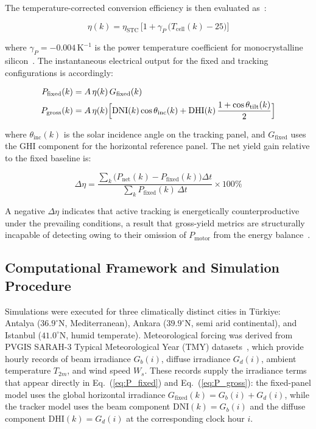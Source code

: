 \documentclass[preprint,3p,12pt]{elsarticle}
\newcommand{\degr}{^{\circ}}
\newcommand{\thetatilt}{\theta_{\mathrm{tilt}}}
\newcommand{\thetainc}{\theta_{\mathrm{inc}}}
\newcommand{\dt}{\Delta t}
\begin{document}
The temperature-corrected conversion efficiency is then evaluated as~\cite{Dubey2013}:

\begin{equation}
    \eta(k) = \eta_{\mathrm{STC}}\,\bigl[1 + \gamma_P\,
    \bigl(T_{\mathrm{cell}}(k) - 25\bigr)\bigr]
    \label{eq:eta_temp}
\end{equation}

where $\gamma_P = -0.004\,\mathrm{K}^{-1}$ is the power temperature coefficient for monocrystalline silicon~\cite{Dubey2013}. The instantaneous electrical output for the fixed and tracking configurations is accordingly:

\begin{align}
    P_{\mathrm{fixed}}(k) &= A\,\eta(k)\,G_{\mathrm{fixed}}(k)
    \label{eq:P_fixed}\\
    P_{\mathrm{gross}}(k) &= A\,\eta(k) \Bigl[
    \mathrm{DNI}(k)\cos\thetainc(k)
    + \mathrm{DHI}(k)\,\frac{1+\cos\thetatilt(k)}{2}
    \Bigr]
    \label{eq:P_gross}
\end{align}

where $\thetainc(k)$ is the solar incidence angle on the tracking panel, and $G_{\mathrm{fixed}}$ uses the GHI component for the horizontal reference panel. The net yield gain relative to the fixed baseline is:

\begin{equation}
    \Delta\eta = \frac{\sum_{k} \bigl(P_{\mathrm{net}}(k) -
    P_{\mathrm{fixed}}(k)\bigr)\dt}
    {\sum_{k} P_{\mathrm{fixed}}(k)\,\dt} \times 100\%
    \label{eq:gain}
\end{equation}

A negative $\Delta\eta$ indicates that active tracking is energetically counterproductive under the prevailing conditions, a result that gross-yield metrics are structurally incapable of detecting owing to their omission of $P_{\mathrm{motor}}$ from the energy balance~\cite{Tan2021}.

\subsection{Computational Framework and Simulation Procedure}
\label{sec:sim_setup}

Simulations were executed for three climatically distinct cities in
Türkiye: Antalya ($36.9\degr$N, Mediterranean), Ankara ($39.9\degr$N,
semi arid continental), and Istanbul ($41.0\degr$N, humid temperate).
Meteorological forcing was derived from PVGIS SARAH-3 Typical
Meteorological Year (TMY) datasets~\cite{PVGIS2023}, which provide
hourly records of beam irradiance $G_b(i)$, diffuse irradiance
$G_d(i)$, ambient temperature $T_{2m}$, and wind speed $W_s$. These
records supply the irradiance terms that appear directly in
Eq.~(\ref{eq:P_fixed}) and Eq.~(\ref{eq:P_gross}): the fixed-panel
model uses the global horizontal irradiance
$G_{\mathrm{fixed}}(k) = G_b(i) + G_d(i)$, while the tracker model
uses the beam component $\mathrm{DNI}(k) = G_b(i)$ and the diffuse
component $\mathrm{DHI}(k) = G_d(i)$ at the corresponding clock
hour $i$.
\end{document}
